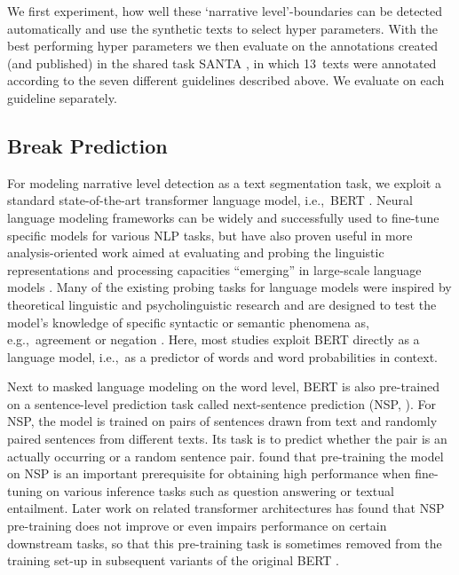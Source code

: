 \documentclass[10pt, a4paper]{article}
\begin{document}
We first experiment, how well these \enquote*{narrative level}-boundaries can be detected automatically and use the synthetic texts to select hyper parameters. With the best performing hyper parameters we then evaluate on the annotations created (and published) in the shared task SANTA , in which 13~texts were annotated according to the seven different guidelines described above. We evaluate on each guideline separately.

\subsection{Break Prediction}

For modeling narrative level detection as a text segmentation task, we exploit a standard state-of-the-art transformer language model, i.e.,~BERT \cite{devlin_bert_2019}.
Neural language modeling frameworks can be widely and successfully used to fine-tune specific models for various NLP tasks, but have also proven useful in more analysis-oriented work aimed at evaluating and probing the linguistic representations and processing capacities \enquote{emerging} in large-scale language models \cite{belinkov2019}.
Many of the existing probing tasks for language models were inspired by theoretical linguistic and psycholinguistic research \cite{belinkov2019} and are designed to test the model's knowledge of specific syntactic or semantic phenomena as, e.g.,~agreement \cite{linzen2016assessing} or negation \cite{ettinger2020bert}. 
Here, most studies exploit BERT directly as a language model, i.e.,~as a predictor of words and word probabilities in context.

Next to masked language modeling on the word level, BERT is also pre-trained on a sentence-level prediction task called next-sentence prediction (NSP, ).
For NSP, the model is trained on pairs of sentences drawn from text and randomly paired sentences from different texts. Its task is to predict whether the pair is an actually occurring or a random sentence pair.  found that pre-training the model on NSP is an important prerequisite for obtaining high performance when fine-tuning on various inference tasks such as question answering or textual entailment.
Later work on related transformer architectures has found that NSP pre-training does not improve or even impairs performance on certain downstream tasks, so that this pre-training task is sometimes removed from the training set-up in subsequent variants of the original BERT \cite{liu2019roberta}. 
\end{document}
